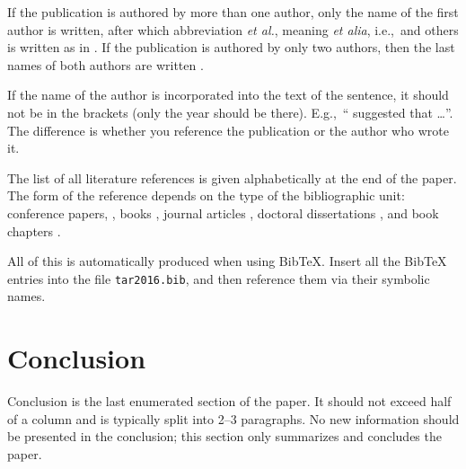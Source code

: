 \documentclass[10pt, a4paper]{article}
\begin{document}
If the publication is authored by more than one author, only the name of the first author is written, after which abbreviation \emph{et al.}, meaning \emph{et alia}, i.e.,~and others is written as in \citep{johnson-etc}. If the publication is authored by only two authors, then the last names of both authors are written \citep{johnson-howells}.

If the name of the author is incorporated into the text of the sentence, it should not be in the brackets (only the year should be there). E.g.,~``\citet{chomsky-73}
suggested that \dots''. The difference is whether you reference the publication or the author who wrote it. 

The list of all literature references is given alphabetically at the end of the paper. The form of the reference depends on the type of the bibliographic unit: conference papers,
\citep{chave-64}, books \citep{butcher-81}, journal articles
\citep{howells-51}, doctoral dissertations \citep{croft-78}, and book chapters \citep{feigl-58}. 

All of this is automatically produced when using BibTeX. Insert all the BibTeX entries into the file \texttt{tar2016.bib}, and then reference them via their symbolic names.

\section{Conclusion}

Conclusion is the last enumerated section of the paper. It should not exceed half of a column and is typically split into 2--3 paragraphs. No new information should be presented in the conclusion; this section only summarizes and concludes the paper.


 
\end{document}
